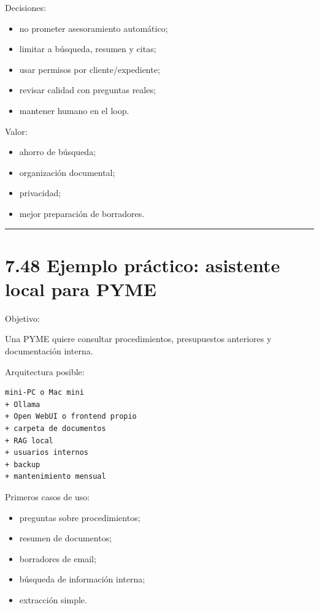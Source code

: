Decisiones:

\begin{itemize}
\tightlist
\item
  no prometer asesoramiento automático;
\item
  limitar a búsqueda, resumen y citas;
\item
  usar permisos por cliente/expediente;
\item
  revisar calidad con preguntas reales;
\item
  mantener humano en el loop.
\end{itemize}

Valor:

\begin{itemize}
\tightlist
\item
  ahorro de búsqueda;
\item
  organización documental;
\item
  privacidad;
\item
  mejor preparación de borradores.
\end{itemize}

\begin{center}\rule{0.5\linewidth}{0.5pt}\end{center}

\section{7.48 Ejemplo práctico: asistente local para
PYME}\label{ejemplo-pruxe1ctico-asistente-local-para-pyme}

Objetivo:

Una PYME quiere consultar procedimientos, presupuestos anteriores y
documentación interna.

Arquitectura posible:

\begin{lstlisting}
mini-PC o Mac mini
+ Ollama
+ Open WebUI o frontend propio
+ carpeta de documentos
+ RAG local
+ usuarios internos
+ backup
+ mantenimiento mensual
\end{lstlisting}

Primeros casos de uso:

\begin{itemize}
\tightlist
\item
  preguntas sobre procedimientos;
\item
  resumen de documentos;
\item
  borradores de email;
\item
  búsqueda de información interna;
\item
  extracción simple.
\end{itemize}

